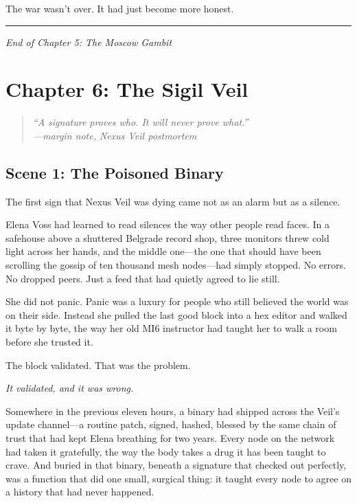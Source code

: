 \documentclass[12pt,letterpaper]{book}
\begin{document}
The war wasn't over. It had just become more honest.

\begin{center}\rule{0.5\linewidth}{0.5pt}\end{center}

\emph{End of Chapter 5: The Moscow Gambit}


\hypertarget{chapter-6-the-sigil-veil}{%
\section{Chapter 6: The Sigil Veil}\label{chapter-6-the-sigil-veil}}

\begin{quote}
\itshape ``A signature proves who. It will never prove what.''\\
\normalfont\hfill---margin note, Nexus Veil postmortem
\end{quote}

\hypertarget{scene-1-the-poisoned-binary}{%
\subsection{Scene 1: The Poisoned Binary}\label{scene-1-the-poisoned-binary}}

The first sign that Nexus Veil was dying came not as an alarm but as a silence.

Elena Voss had learned to read silences the way other people read faces. In a safehouse above a shuttered Belgrade record shop, three monitors threw cold light across her hands, and the middle one---the one that should have been scrolling the gossip of ten thousand mesh nodes---had simply stopped. No errors. No dropped peers. Just a feed that had quietly agreed to lie still.

She did not panic. Panic was a luxury for people who still believed the world was on their side. Instead she pulled the last good block into a hex editor and walked it byte by byte, the way her old MI6 instructor had taught her to walk a room before she trusted it.

The block validated. That was the problem.

\emph{It validated, and it was wrong.}

Somewhere in the previous eleven hours, a binary had shipped across the Veil's update channel---a routine patch, signed, hashed, blessed by the same chain of trust that had kept Elena breathing for two years. Every node on the network had taken it gratefully, the way the body takes a drug it has been taught to crave. And buried in that binary, beneath a signature that checked out perfectly, was a function that did one small, surgical thing: it taught every node to agree on a history that had never happened.
\end{document}
